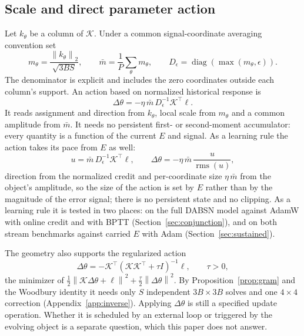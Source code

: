 \documentclass[11pt]{article}
\theoremstyle{definition}
\newcommand{\diag}{\operatorname{diag}}
\newcommand{\norm}[1]{\left\lVert #1\right\rVert}
\begin{document}
\subsection{Scale and direct parameter action}
\label{sec:action}

Let $k_\theta$ be a column of $\mathcal K$. Under a common signal-coordinate
averaging convention set
\begin{equation}
 m_\theta=\frac{\norm{k_\theta}_2}{\sqrt{3BS}},\qquad
 \bar m=\frac1P\sum_\theta m_\theta,\qquad
 D_\epsilon=\diag(\max(m_\theta,\epsilon)).
 \label{eq:response-rms}
\end{equation}
The denominator is explicit and includes the zero coordinates outside each
column's support. An action based on normalized historical response is
\begin{equation}
 \Delta\theta=-\eta\,\bar m\,D_\epsilon^{-1}\mathcal K^\top\ell.
 \label{eq:normalized-action}
\end{equation}
It reads assignment and direction from $k_\theta$, local scale from $m_\theta$ and a
common amplitude from $\bar m$. It needs no persistent first- or second-moment
accumulator: every quantity is a function of the current $E$ and signal. As a
learning rule the action takes its pace from $E$ as well:
\begin{equation}
 u=\bar m\,D_\epsilon^{-1}\mathcal K^\top\ell,\qquad
 \Delta\theta=-\eta\,\bar m\,\frac{u}{\operatorname{rms}(u)},
 \label{eq:paced-action}
\end{equation}
direction from the normalized credit and per-coordinate size $\eta\,\bar m$ from the
object's amplitude, so the size of the action is set by $E$ rather than by the
magnitude of the error signal; there is no persistent state and no clipping. As a
learning rule it is tested in two places: on the full DABSN model against AdamW
with online credit and with BPTT (Section~\ref{sec:conjunction}), and on both stream
benchmarks against carried $E$ with Adam (Section~\ref{sec:sustained}).

The geometry also supports the regularized action
\begin{equation}
 \Delta\theta=-\mathcal K^\top(\mathcal K\mathcal K^\top+\tau I)^{-1}\ell,\qquad\tau>0,
 \label{eq:direct-action}
\end{equation}
the minimizer of $\tfrac12\norm{\mathcal K\Delta\theta+\ell}^2+\tfrac\tau2\norm{\Delta\theta}^2$.
By Proposition~\ref{prop:gram} and the Woodbury identity it needs only $S$
independent $3B\times3B$ solves and one $4\times4$ correction
(Appendix~\ref{app:inverse}). Applying $\Delta\theta$ is still a specified update
operation. Whether it is scheduled by an external loop or triggered by the
evolving object is a separate question, which this paper does not answer.
\end{document}
